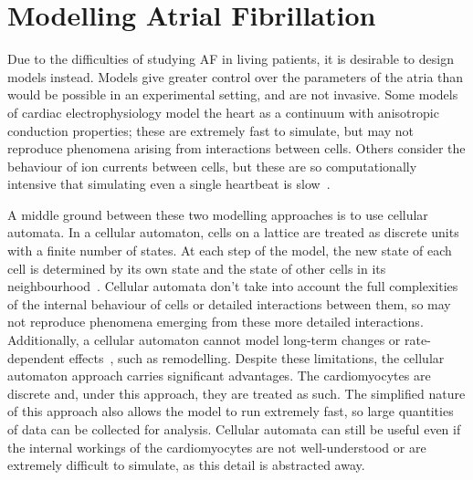 

\section{Modelling Atrial Fibrillation}

Due to the difficulties of studying AF in living patients, it is desirable to design models instead. Models give greater control over the parameters of the atria than would be possible in an experimental setting, and are not invasive. Some models of cardiac electrophysiology model the heart as a continuum with anisotropic conduction properties; these are extremely fast to simulate, but may not reproduce phenomena arising from interactions between cells. Others consider the behaviour of ion currents between cells, but these are so computationally intensive that simulating even a single heartbeat is slow~\cite{Butters20120067, harrild2000computer, zhaoperformance}.

A middle ground between these two modelling approaches is to use cellular automata. In a cellular automaton, cells on a lattice are treated as discrete units with a finite number of states. At each step of the model, the new state of each cell is determined by its own state and the state of other cells in its neighbourhood~\cite{wolfram1983statistical}. Cellular automata don't take into account the full complexities of the internal behaviour of cells or detailed interactions between them, so may not reproduce phenomena emerging from these more detailed interactions. Additionally, a cellular automaton cannot model long-term changes or rate-dependent effects~\cite{pullan2005mathematically}, such as remodelling.
Despite these limitations, the cellular automaton approach carries significant advantages. The cardiomyocytes are discrete and, under this approach, they are treated as such. The simplified nature of this approach also allows the model to run extremely fast, so large quantities of data can be collected for analysis. Cellular automata can still be useful even if the internal workings of the cardiomyocytes are not well-understood or are extremely difficult to simulate, as this detail is abstracted away.

